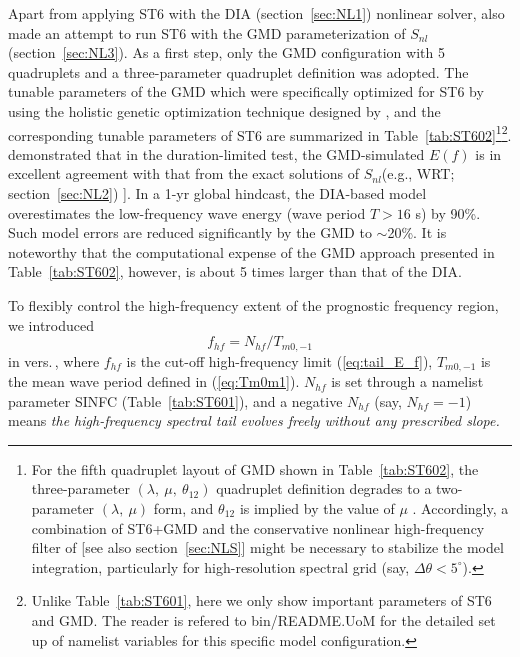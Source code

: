Apart from applying {\code ST6} with the {\code DIA} (section~\ref{sec:NL1}) nonlinear solver, \citet{Liu2018}
also made an attempt to run {\code ST6} with the {\code GMD} parameterization of $S_{nl}$
(section~\ref{sec:NL3}). As a first step, only the {\code GMD} configuration with
5 quadruplets and a three-parameter quadruplet definition
\citep[i.e., {\code G35} in][]{tol:OMOD13d} was adopted. The tunable parameters
of the {\code GMD} which were specifically optimized for {\code ST6} by using the holistic
genetic optimization technique designed by \citet{tol:OMOD13e}, and the
corresponding tunable parameters of {\code ST6} are summarized in
Table~\ref{tab:ST602}\footnote{For the fifth quadruplet layout of {\code GMD} shown
in Table~\ref{tab:ST602}, the three-parameter $(\lambda,\ \mu,\ \theta_{12})$
quadruplet definition degrades to a two-parameter $(\lambda,\ \mu)$ form, and
$\theta_{12}$ is implied by the value of $\mu$ \citep{tol:OMOD13d}. Accordingly,
a combination of {\code ST6+GMD} and the conservative nonlinear high-frequency
filter of \citet{tol:OMOD11} [see also section~\ref{sec:NLS}] might be
necessary to stabilize the model integration, particularly for high-resolution
spectral grid (say, $\Delta \theta < 5^{\circ}$).}\footnote{Unlike
Table~\ref{tab:ST601}, here we only show important parameters of {\code ST6} and
{\code GMD}. The reader is refered to {\code bin/README.UoM} for the detailed
set up of namelist variables for this specific model configuration.}.
\citet{Liu2018} demonstrated that in the duration-limited test, the
{\code GMD}-simulated $E(f)$ is in excellent agreement with that from the exact
 solutions of $S_{nl}$(e.g., {\code WRT}; section~\ref{sec:NL2}) \citep[see also][]{tol:OMOD13d}]. In a 1-yr global
hindcast, the {\code DIA}-based model overestimates the low-frequency wave energy
(wave period $T > 16$ s) by 90\%. Such model errors are reduced significantly
by the {\code GMD} to $\sim$20\%. It is noteworthy that the computational expense
of the {\code GMD} approach presented in Table~\ref{tab:ST602}, however, is about
5 times larger than that of the {\code DIA}.

To flexibly control the high-frequency extent of the prognostic frequency
region, we introduced
\begin{equation}
f_{hf} = N_{hf}/T_{m0, -1}
\end{equation}
in vers.\,\WWver, where $f_{hf}$ is the cut-off high-frequency limit
(\ref{eq:tail_E_f}), $T_{m0,-1}$ is the mean wave period defined in
(\ref{eq:Tm0m1}). $N_{hf}$ is set through a namelist parameter SINFC
(Table~\ref{tab:ST601}), and a negative $N_{hf}$ (say, $N_{hf} = -1$)
means \emph{the high-frequency spectral tail evolves freely without any
prescribed slope.}

